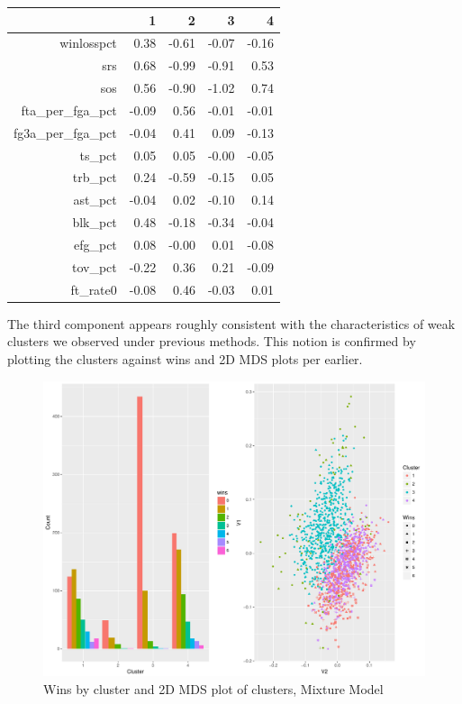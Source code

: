 \documentclass[10pt,a4paper, hidelinks]{article} %
\begin{document}
\begin{table}[ht]
	\centering
	\begin{tabular}{rrrrr}
		\hline
		& 1 & 2 & 3 & 4 \\ 
		\hline
		winlosspct & 0.38 & -0.61 & -0.07 & -0.16 \\ 
		srs & 0.68 & -0.99 & -0.91 & 0.53 \\ 
		sos & 0.56 & -0.90 & -1.02 & 0.74 \\ 
		fta\_per\_fga\_pct & -0.09 & 0.56 & -0.01 & -0.01 \\ 
		fg3a\_per\_fga\_pct & -0.04 & 0.41 & 0.09 & -0.13 \\ 
		ts\_pct & 0.05 & 0.05 & -0.00 & -0.05 \\ 
		trb\_pct & 0.24 & -0.59 & -0.15 & 0.05 \\ 
		ast\_pct & -0.04 & 0.02 & -0.10 & 0.14 \\ 
		blk\_pct & 0.48 & -0.18 & -0.34 & -0.04 \\ 
		efg\_pct & 0.08 & -0.00 & 0.01 & -0.08 \\ 
		tov\_pct & -0.22 & 0.36 & 0.21 & -0.09 \\ 
		ft\_rate0 & -0.08 & 0.46 & -0.03 & 0.01 \\ 
		\hline
	\end{tabular}
\end{table}

The third component appears roughly consistent with the characteristics of weak clusters we observed under previous methods.  This notion is confirmed by plotting the clusters against wins and 2D MDS plots per earlier.  

\begin{figure}[H]
	\centering
	\includegraphics[width=0.7\linewidth]{../fig/sirmixalot}
	\caption{Wins by cluster and 2D MDS plot of clusters, Mixture Model}
\end{figure}
\end{document}
